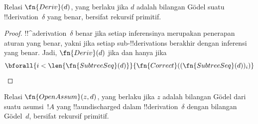 \documentclass[../../../include/open-logic-section]{subfiles}
\begin{document}
\begin{prop}
  Relasi $\fn{Deriv}(d)$, yang berlaku jika $d$ adalah bilangan G\"odel suatu
  !!{derivation}~$\delta$ yang benar, bersifat rekursif primitif.
\end{prop}

\begin{proof}
  !!^a{derivation}~$\delta$ benar jika setiap inferensinya merupakan penerapan
  aturan yang benar, yakni jika setiap sub-!!{derivation}s berakhir dengan
  inferensi yang benar. Jadi, $\fn{Deriv}(d)$ jika dan hanya jika
  \[
  \bforall{i<\len{\fn{SubtreeSeq}(d)}}{\fn{Correct}((\fn{SubtreeSeq}(d))_i)}
  \]
\end{proof}

\begin{prop}
   Relasi $\fn{OpenAssum}(z, d)$, yang berlaku jika
  $z$ adalah bilangan G\"odel dari suatu asumsi~$!A$ yang !!a{undischarged} dalam
  !!{derivation}~$\delta$ dengan bilangan G\"odel~$d$, bersifat rekursif
  primitif.
\end{prop}
\end{document}
